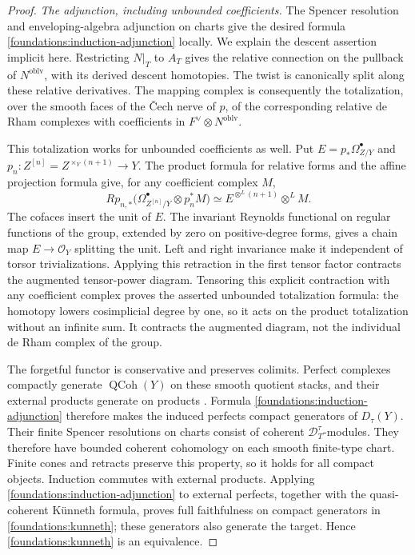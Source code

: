 \begin{proof}
\emph{The adjunction, including unbounded coefficients.}
The Spencer resolution and enveloping-algebra adjunction on charts give
the desired formula \eqref{foundations:induction-adjunction} locally.
We explain the descent assertion implicit here.  Restricting $N|_T$ to
$A_T$ gives the relative connection on the pullback of
$N^{\mathrm{oblv}}$, with its derived descent homotopies.  The twist is
canonically split along these relative derivatives.  The mapping
complex is consequently the totalization, over the smooth faces of the
\v Cech nerve of $p$, of the corresponding relative de Rham complexes
with coefficients in $F^\vee\otimes N^{\mathrm{oblv}}$.

This totalization works for unbounded coefficients as well.  Put
$E=p_*\Omega^\bullet_{Z/Y}$ and
$p_n:Z^{[n]}=Z^{\times_Y(n+1)}\to Y$.  The product formula for relative
forms and the affine projection formula give, for any coefficient
complex $M$,
\[
 Rp_{n,*}\bigl(\Omega^\bullet_{Z^{[n]}/Y}\otimes p_n^*M\bigr)
 \simeq E^{\otimes^L(n+1)}\otimes^L M.
\]
The cofaces insert the unit of $E$.
The invariant Reynolds functional on
regular functions of the group, extended by zero on positive-degree
forms, gives a chain map $E\to\mathcal O_Y$ splitting the unit.
Left and right invariance make it independent of torsor
trivializations.  Applying this retraction in the first tensor factor
contracts the augmented tensor-power diagram.  Tensoring this explicit
contraction with any coefficient complex proves the asserted
unbounded totalization formula: the homotopy lowers cosimplicial degree
by one, so it acts on the product totalization without an infinite sum.
It contracts the augmented diagram,
not the individual de Rham complex of the group.

The forgetful functor is conservative and preserves colimits.  Perfect
complexes compactly generate $\operatorname{QCoh}(Y)$ on these smooth
quotient stacks, and their external products generate on products
\cite[Sections~3--4]{DrinfeldGaitsgoryFiniteness}.  Formula
\eqref{foundations:induction-adjunction} therefore makes the induced
perfects compact generators of $D_\tau(Y)$.  Their finite Spencer
resolutions on charts consist of coherent $\mathcal D_T^\tau$-modules.
They therefore have bounded coherent cohomology on each smooth
finite-type chart.  Finite cones and retracts preserve this property,
so it holds for all compact objects.  Induction commutes with external
products.  Applying
\eqref{foundations:induction-adjunction} to external perfects, together
with the quasi-coherent K\"unneth formula, proves full faithfulness on
compact generators in \eqref{foundations:kunneth}; these generators also
generate the target.  Hence \eqref{foundations:kunneth} is an equivalence.


\end{proof}
